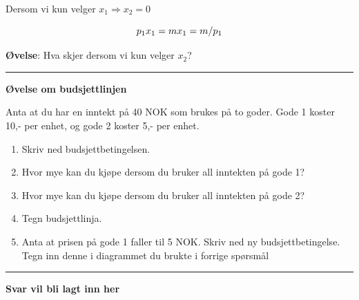\documentclass[
  letterpaper,
  DIV=11,
  numbers=noendperiod]{scrartcl}
\providecommand{\tightlist}{%
  \setlength{\itemsep}{0pt}\setlength{\parskip}{0pt}}\usepackage{longtable,booktabs,array}
\begin{document}
Dersom vi kun velger \(x_1 \Rightarrow x_2=0\)

\begin{equation}
p_{1}x_{1}=m \\
x_{1} =m/p_{1}
\end{equation}

\textbf{Øvelse}: Hva skjer dersom vi kun velger \(x_2\)?

\begin{center}\rule{0.5\linewidth}{0.5pt}\end{center}

\textbf{Øvelse om budsjettlinjen}

Anta at du har en inntekt på 40 NOK som brukes på to goder. Gode 1
koster 10,- per enhet, og gode 2 koster 5,- per enhet.

\begin{enumerate}
\def\labelenumi{\arabic{enumi}.}
\tightlist
\item
  Skriv ned budsjettbetingelsen.
\item
  Hvor mye kan du kjøpe dersom du bruker all inntekten på gode 1?
\item
  Hvor mye kan du kjøpe dersom du bruker all inntekten på gode 2?
\item
  Tegn budsjettlinja.
\item
  Anta at prisen på gode 1 faller til 5 NOK. Skriv ned ny
  budsjettbetingelse. Tegn inn denne i diagrammet du brukte i forrige
  spørsmål
\end{enumerate}

\begin{center}\rule{0.5\linewidth}{0.5pt}\end{center}

\textbf{Svar vil bli lagt inn her}
\end{document}
